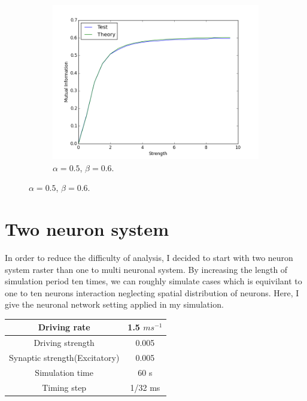 \documentclass{article}
\begin{document}
\begin{figure}[h]
\begin{subfigure}[b]{0.3\textwidth}
				\includegraphics[width = \textwidth]{gauss/linear_05_06_50.png}
				\caption{$\alpha = 0.5$, $\beta = 0.6$.}
			\end{subfigure}
		\end{figure}

	\section{Two neuron system}
		In order to reduce the difficulty of analysis, I decided to start with two neuron system raster than one to multi neuronal system. By increasing the length of simulation period ten times, we can roughly simulate cases which is equivilant to one to ten neurons interaction neglecting spatial distribution of neurons.
		Here, I give the neuronal network setting applied in my simulation.
		\begin{tabular}{c|c}
			\hline
			Driving rate & 1.5 $ms^{-1}$\\
			\hline
			Driving strength & 0.005 \\
			\hline
			Synaptic strength(Excitatory)& 0.005 \\
			\hline
			Simulation time & 60 s\\
			\hline
			Timing step & 1/32 ms \\
			\hline
		\end{tabular}
\end{document}

